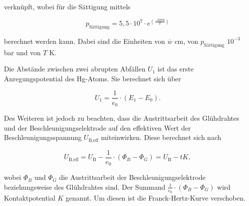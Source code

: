 verknüpft, wobei für die Sättigung mittels

\begin{equation}
    \label{eqn:saettigung}
    p_\text{Sättigung} = 5,5 \cdot 10^7 \cdot e^(\frac{-6876}{T})
\end{equation}

berechnet werden kann. Dabei sind die Einheiten von $\overline{w}$ cm, von $p_\text{Sättigung}$ $10^{-3}$ bar und von $T$ K.


Die Abstände zwischen zwei abrupten Abfällen $U_1$ ist das erste Anregungspotential des Hg-Atoms. Sie berechnet sich über

\begin{equation}
    \label{eqn:anregungspotential}
    U_1 = \frac{1}{e_0} \cdot (E_1 - E_0).
\end{equation}

Des Weiteren ist jedoch zu beachten, dass die Austrittsarbeit des Glühdrahtes und der Beschleunigungselektrode auf den effektiven Wert der Beschleunigungsspannung $U_\text{B,eff}$ miteinwirken.
Diese berechnet sich nach

\begin{equation}
    \label{eqn:accl-eff}
    U_\text{B,eff} = U_\text{B} - \frac{1}{e_0} \cdot (\Phi_B - \Phi_G) = U_\text{B} -t K,
\end{equation}

wobei $\Phi_B$ und $\Phi_G$ die Austrittsarbeit der Beschleunigungselektrode beziehungsweise des Glühdrahtes sind.
Der Summand $\frac{1}{e_0} \cdot (\Phi_B - \Phi_G)$ wird Kontaktpotential $K$ genannt. Um diesen ist die Franck-Hertz-Kurve verschoben.
